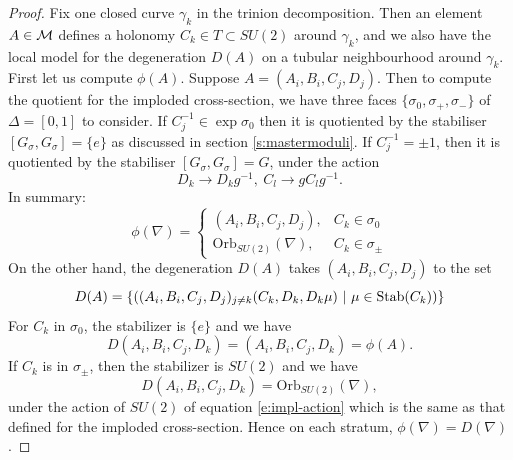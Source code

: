 	\begin{proof}
		Fix one closed curve $\gamma_k$ in the trinion decomposition. Then an element $A\in \mathcal{M}$ defines a holonomy $C_k\in T\subset SU(2)$ around $\gamma_k$, and we also have the local model for the degeneration $D(A)$ on a tubular neighbourhood around $\gamma_k$. First let us compute $\phi(A)$. Suppose $A = (A_i,B_i,C_j,D_j)$. Then to compute the quotient for the imploded cross-section, we have three faces $\{\sigma_0, \sigma_+, \sigma_-\}$ of $\Delta = [0,1]$ to consider. If $C_j^{-1} \in \exp \sigma_0$ then it is quotiented by the stabiliser $[G_\sigma,G_\sigma] = \{e\}$ as discussed in section \ref{s:mastermoduli}. If $C_j^{-1} = \pm 1$, then it is quotiented by the stabiliser $[G_\sigma, G_\sigma] = G$, under the action
		\begin{equation}
			D_k \to D_k g^{-1},~ C_l \to g C_l g^{-1}.
		\end{equation}
		In summary:
		\begin{equation}
			\phi(\nabla) = \begin{cases}
				(A_i,B_i,C_j,D_j), & C_k \in \sigma_0\\
				\text{Orb}_{SU(2)}(\nabla) , & C_k \in \sigma_\pm
			\end{cases}
		\end{equation}
		On the other hand, the degeneration $D(A)$ takes $(A_i,B_i,C_j,D_j)$ to the set
		\begin{equation}
			D(A) = \left\{
			\left(
			(A_i,B_i,C_j,D_j)_{j\neq k} (C_k, D_k, D_k\mu) ~|~ \mu \in \text{Stab}(C_k)
			\right)
			\right\}
		\end{equation}
		For $C_k$ in $\sigma_0$, the stabilizer is $\{e\}$ and we have
		\begin{equation}
			D(A_i,B_i,C_j,D_k) = (A_i,B_i,C_j,D_k) = \phi(A).
		\end{equation}
		If $C_k$ is in $\sigma_\pm$, then the stabilizer is $SU(2)$ and we have
		\begin{equation}
			D(A_i,B_i,C_j,D_k) = \text{Orb}_{SU(2)}(\nabla),
		\end{equation}
		under the action of $SU(2)$ of equation \ref{e:impl-action} which is the same as that defined for the imploded cross-section. Hence on each stratum, $\phi(\nabla) = D(\nabla)$. 
		

\end{proof}
